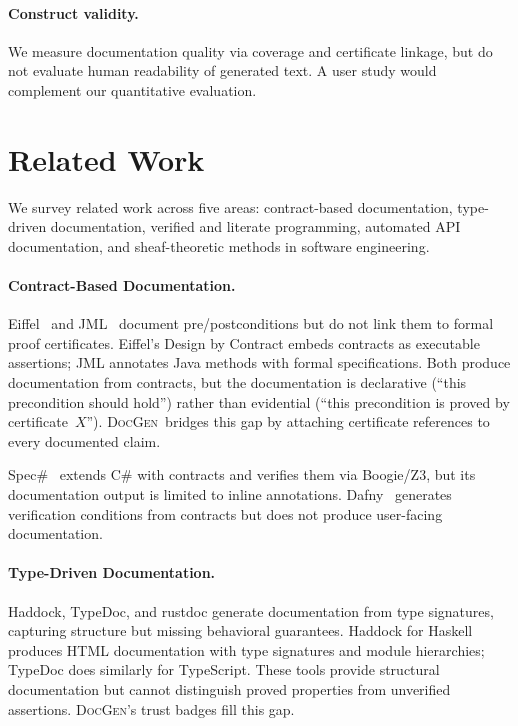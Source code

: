 \documentclass[11pt]{article}
\newcommand{\DocGen}{\textsc{DocGen}}
\begin{document}
\paragraph{Construct validity.}
We measure documentation quality via coverage and certificate
linkage, but do not evaluate human readability of generated text.
A user study would complement our quantitative evaluation.

\section{Related Work}\label{sec:related}

We survey related work across five areas: contract-based documentation,
type-driven documentation, verified and literate programming, automated
API documentation, and sheaf-theoretic methods in software engineering.

\paragraph{Contract-Based Documentation.}
Eiffel~\cite{Meyer1997} and JML~\cite{JML2005} document
pre/postconditions but do not link them to formal proof certificates.
Eiffel's Design by Contract embeds contracts as executable assertions;
JML annotates Java methods with formal specifications.  Both produce
documentation from contracts, but the documentation is declarative (``this
precondition should hold'') rather than evidential (``this precondition
is proved by certificate~$X$'').  \DocGen\ bridges this gap by attaching
certificate references to every documented claim.

Spec\#~\cite{BarnettEtAl2004} extends C\# with contracts and verifies
them via Boogie/Z3, but its documentation output is limited to inline
annotations.  Dafny~\cite{Leino2010} generates verification conditions
from contracts but does not produce user-facing documentation.

\paragraph{Type-Driven Documentation.}
Haddock, TypeDoc, and rustdoc generate documentation from type
signatures, capturing structure but missing behavioral guarantees.
Haddock for Haskell produces HTML documentation with type signatures
and module hierarchies; TypeDoc does similarly for TypeScript.
These tools provide structural documentation but cannot distinguish
proved properties from unverified assertions.  \DocGen's trust badges
fill this gap.
\end{document}

